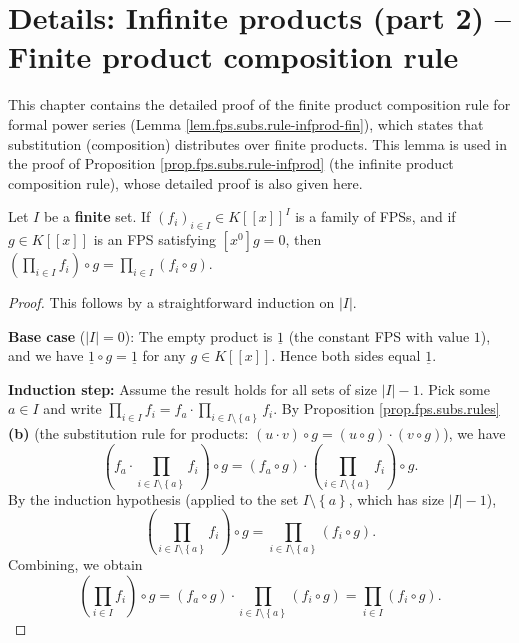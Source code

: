 \section{Details: Infinite products (part 2) -- Finite product composition rule}

This chapter contains the detailed proof of the finite product composition
rule for formal power series (Lemma \ref{lem.fps.subs.rule-infprod-fin}),
which states that substitution (composition) distributes over finite products.
This lemma is used in the proof of Proposition \ref{prop.fps.subs.rule-infprod}
(the infinite product composition rule), whose detailed proof is also given here.

\begin{lemma}
\label{lem.fps.subs.rule-infprod-fin}
\leantarget
\leanok
Let $I$ be a \textbf{finite} set. If
$\left(  f_{i}\right)  _{i\in I}\in K\left[  \left[  x\right]  \right]  ^{I}$
is a family of FPSs, and if $g\in K\left[  \left[  x\right]  \right]  $ is an
FPS satisfying $\left[  x^{0}\right]  g=0$, then $\left(  \prod_{i\in I}%
f_{i}\right)  \circ g=\prod_{i\in I}\left(  f_{i}\circ g\right)  $.
\end{lemma}

\begin{proof}
\leanok
This follows by a straightforward induction on $\left\vert I\right\vert $.

\textbf{Base case} ($\left\vert I\right\vert =0$):
The empty product is $\underline{1}$ (the constant FPS with value $1$),
and we have $\underline{1}\circ g=\underline{1}$ for any
$g\in K\left[  \left[  x\right]  \right]  $.
Hence both sides equal $\underline{1}$.

\textbf{Induction step:}
Assume the result holds for all sets of size $\left\vert I\right\vert - 1$.
Pick some $a\in I$ and write
$\prod_{i\in I}f_{i}=f_{a}\cdot\prod_{i\in I\setminus\left\{  a\right\}  }f_{i}$.
By Proposition \ref{prop.fps.subs.rules} \textbf{(b)}
(the substitution rule for products:
$\left(  u\cdot v\right)  \circ g=\left(  u\circ g\right)  \cdot\left(
v\circ g\right)  $), we have
\[
\left(  f_{a}\cdot\prod_{i\in I\setminus\left\{  a\right\}  }f_{i}\right)
\circ g=\left(  f_{a}\circ g\right)  \cdot\left(  \prod_{i\in
I\setminus\left\{  a\right\}  }f_{i}\right)  \circ g.
\]
By the induction hypothesis (applied to the set
$I\setminus\left\{  a\right\}  $, which has size
$\left\vert I\right\vert -1$),
\[
\left(  \prod_{i\in I\setminus\left\{  a\right\}  }f_{i}\right)  \circ
g=\prod_{i\in I\setminus\left\{  a\right\}  }\left(  f_{i}\circ g\right)  .
\]
Combining, we obtain
\[
\left(  \prod_{i\in I}f_{i}\right)  \circ g=\left(  f_{a}\circ g\right)
\cdot\prod_{i\in I\setminus\left\{  a\right\}  }\left(  f_{i}\circ g\right)
=\prod_{i\in I}\left(  f_{i}\circ g\right)  .
\]
\end{proof}

